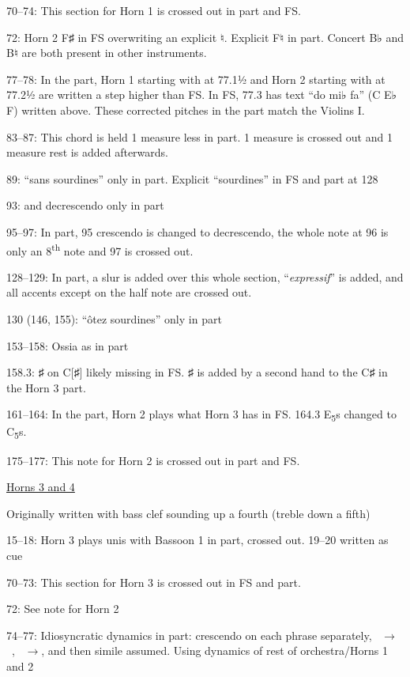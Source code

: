 \documentclass[twoside]{article}
\newcommand\dynmark[1]{\scalebox{0.9}{#1}{\kern1pt}}
\begin{document}
\begin{hangparas}{15pt}{1}
\begin{multicols}{2}
70--74: This section for Horn 1 is crossed out in part and FS.

72: Horn 2 F♯ in FS overwriting an explicit ♮. Explicit F♮ in part. Concert B♭ and B♮ are both present in other instruments.

77--78: In the part, Horn 1 starting with at 77.1½ and Horn 2 starting with at 77.2½ are written a step higher than FS. In FS, 77.3 has text ``do mi♭ fa'' (C E♭ F) written above. These corrected pitches in the part match the Violins I.

83--87: This chord is held 1 measure less in part. 1 measure is crossed out and 1 measure rest is added afterwards.

89: ``sans sourdines'' only in part. Explicit ``sourdines'' in FS and part at 128

93: \dynmark{\sF} and decrescendo only in part

95--97: In part, 95 crescendo is changed to decrescendo, the whole note at 96 is only an 8\textsuperscript{th} note and 97 is crossed out.

128--129: In part, a slur is added over this whole section, ``\textit{expressif}'' is added, and all accents except on the half note are crossed out.

130 (146, 155): ``ôtez sourdines'' only in part

153--158: Ossia as in part

158.3: ♯ on C[♯] likely missing in FS. ♯ is added by a second hand to the C♯ in the Horn 3 part.

161--164: In the part, Horn 2 plays what Horn 3 has in FS. 164.3 E\textsubscript{5}s changed to C\textsubscript{5}s.

175--177: This note for Horn 2 is crossed out in part and FS.

\underline{Horns 3 and 4}

Originally written with bass clef sounding up a fourth (treble down a fifth)

15--18: Horn 3 plays unis with Bassoon 1 in part, crossed out. 19--20 written as cue

70--73: This section for Horn 3 is crossed out in FS and part.

72: See note for Horn 2

74--77: Idiosyncratic dynamics in part: crescendo on each phrase separately, \mbox{\dynmark{\p} $\rightarrow $ \dynmark{\f}}, \mbox{\dynmark{\mf} $\rightarrow $\dynmark{\ff}}, and then simile assumed. Using dynamics of rest of orchestra/Horns 1 and 2


\end{multicols}
\end{hangparas}
\end{document}
